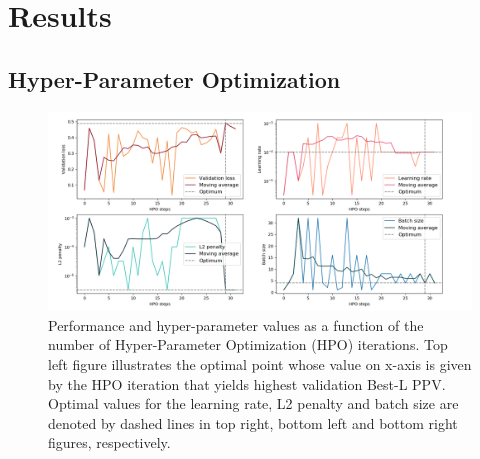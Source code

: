 \chapter{Results}


\section{Hyper-Parameter Optimization}

    \begin{figure}[H]
        \begin{center}
            \includegraphics[width=\textwidth, keepaspectratio]{imgs/hpo.png}
            \caption{Performance and hyper-parameter values as a function of the number
            of Hyper-Parameter Optimization (HPO) iterations.
            Top left figure illustrates the optimal point whose value on x-axis
            is given by the HPO iteration that yields highest validation Best-L PPV.
            Optimal values for the learning rate, L2 penalty and batch size are denoted
            by dashed lines in top right, bottom left and bottom right figures, respectively.}
            \label{hpoparams}
        \end{center}
    \end{figure}

